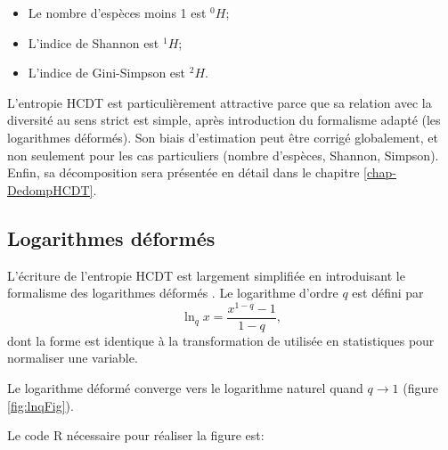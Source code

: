 \documentclass[
  11pt,
  french,
  a4paper,
  extrafontsizes,onecolumn,openright
  ]{memoir}
\providecommand{\tightlist}{%
  \setlength{\itemsep}{0pt}\setlength{\parskip}{0pt}}
\begin{document}
\begin{itemize}
\tightlist
\item
  Le nombre d'espèces moins 1 est \(^{0}\!H\);
\item
  L'indice de Shannon est \(^{1}\!H\);
\item
  L'indice de Gini-Simpson est \(^{2}\!H\).
\end{itemize}

L'entropie HCDT est particulièrement attractive parce que sa relation avec la diversité au sens strict est simple, après introduction du formalisme adapté (les logarithmes déformés).
Son biais d'estimation peut être corrigé globalement, et non seulement pour les cas particuliers (nombre d'espèces, Shannon, Simpson).
Enfin, sa décomposition sera présentée en détail dans le chapitre \ref{chap-DedompHCDT}.

\hypertarget{logarithmes-duxe9formuxe9s}{%
\subsection{Logarithmes déformés}\label{logarithmes-duxe9formuxe9s}}

L'écriture de l'entropie HCDT est largement simplifiée en introduisant le formalisme des logarithmes déformés \autocite{Tsallis1994}.
Le logarithme d'ordre \(q\) est défini par
\begin{equation}
  \label{eq:lnq}
  \ln_q{x} = \frac{x^{1-q}-1}{1-q},
\end{equation}
dont la forme est identique à la transformation de \textcite{Box1964} utilisée en statistiques pour normaliser une variable.

Le logarithme déformé converge vers le logarithme naturel quand \(q\to 1\) (figure \ref{fig:lnqFig}).

Le code R nécessaire pour réaliser la figure est:

\scriptsize
\end{document}
